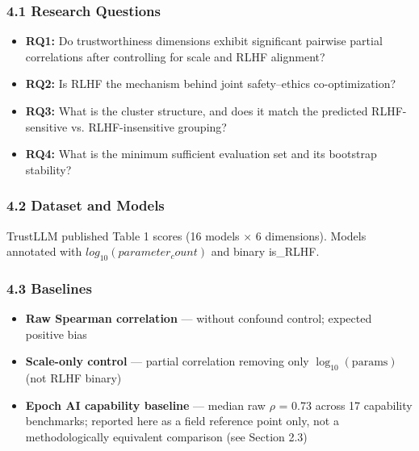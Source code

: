 
\subsubsection{4.1 Research Questions}

\begin{itemize}
\item \textbf{RQ1:} Do trustworthiness dimensions exhibit significant pairwise partial correlations after controlling for scale and RLHF alignment?
\item \textbf{RQ2:} Is RLHF the mechanism behind joint safety--ethics co-optimization?
\item \textbf{RQ3:} What is the cluster structure, and does it match the predicted RLHF-sensitive vs. RLHF-insensitive grouping?
\item \textbf{RQ4:} What is the minimum sufficient evaluation set and its bootstrap stability?
\end{itemize}

\subsubsection{4.2 Dataset and Models}

TrustLLM published Table 1 scores (16 models $\times$ 6 dimensions). Models annotated with $log_{10}(parameter_count)$ and binary is\_RLHF.

\begin{table}[htbp]
\centering
{}
\end{table}

\subsubsection{4.3 Baselines}

\begin{itemize}
\item \textbf{Raw Spearman correlation} --- without confound control; expected positive bias
\item \textbf{Scale-only control} --- partial correlation removing only $\log_{10}(\text{params})$ (not RLHF binary)
\item \textbf{Epoch AI capability baseline} --- median raw $\rho$ = 0.73 across 17 capability benchmarks; reported here as a field reference point only, not a methodologically equivalent comparison (see Section 2.3)
\end{itemize}

